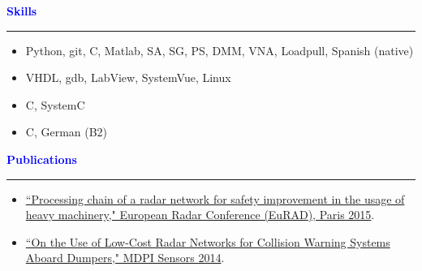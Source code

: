 \documentclass[10pt, letterpaper]{letter}
\def\myplus{\hspace{-.3em}\raisebox{.4ex}{ \tiny +}}
\def\cpp{C\myplus\myplus}
\def\csharp{C\nolinebreak[4]\hspace{-.3em}\raisebox{.25ex}{ \small \#}}
\def\sa{\raisebox{-.4ex}{\FilledSmallCircle\FilledSmallCircle\FilledSmallCircle\FilledSmallCircle\FilledSmallCircle}}
\def\sb{\raisebox{-.4ex}{\FilledSmallCircle\FilledSmallCircle\FilledSmallCircle\FilledSmallCircle\SmallCircle}}
\def\sc{\raisebox{-.4ex}{\FilledSmallCircle\FilledSmallCircle\FilledSmallCircle\SmallCircle\SmallCircle}}
\def\sd{\raisebox{-.4ex}{\FilledSmallCircle\FilledSmallCircle\SmallCircle\SmallCircle\SmallCircle}}
\begin{document}
\begin{minipage}[t]{.47\linewidth}
    \textcolor{Blue}{
        \large\textbf{Skills}
        \vspace{3pt}
        \hrule height 1.5pt
	\vspace{6pt}
    }
    \begin{itemize}[leftmargin=5.3em]
        \item[\sa] Python, git, C, Matlab, SA, SG, PS, DMM, VNA, Loadpull, Spanish (native)
        \item[\sb] VHDL, gdb, LabView, SystemVue, Linux
        \item[\sc] \cpp, SystemC
        \item[\sd] \csharp, German (B2)
    \end{itemize}
\end{minipage}
\hfill
\begin{minipage}[t]{.51\linewidth}
    \textcolor{Blue}{
        \large\textbf{Publications}
        \vspace{3pt}
        \hrule height 1.5pt
	\vspace{6pt}
    }
    \begin{itemize}[label=$\bullet$, leftmargin=1em]
	\item \href{http://ieeexplore.ieee.org/xpl/login.jsp?tp=&arnumber=7346261&url=http\%3A\%2F\%2Fieeexplore.ieee.org\%2Fxpls\%2Fabs\_all.jsp\%3Farnumber\%3D7346261}{``Processing chain of a radar network for safety improvement in the usage of heavy machinery," European Radar Conference (EuRAD), Paris 2015}.
	\item \href{http://www.mdpi.com/1424-8220/14/3/3921}{``On the Use of Low-Cost Radar Networks for Collision Warning Systems Aboard Dumpers," MDPI Sensors 2014}.
    \end{itemize}
\end{minipage}

\vfill
\end{document}
